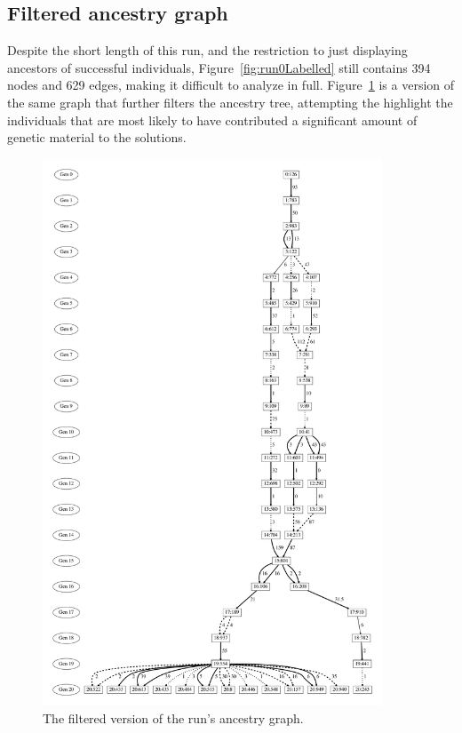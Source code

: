 \subsection{Filtered ancestry graph}

Despite the short length of this run, and the restriction to just displaying
ancestors of successful individuals, Figure~\ref{fig:run0Labelled} still
contains 394 nodes and 629 edges, making it difficult to analyze in full.
Figure~\ref{fig:run0Filtered} is a version of the same graph that further
filters the ancestry tree, attempting the highlight the individuals that
are most likely to have contributed a significant amount of genetic material
to the solutions.

\begin{figure}[tb!p] %
	\begin{center}
		\includegraphics[width=0.9\textwidth]{../figures/run0_GPTP_filtered}
	\end{center}
	\caption{The filtered version of the run's ancestry graph.}
	\label{fig:run0Filtered}       %
\end{figure}

